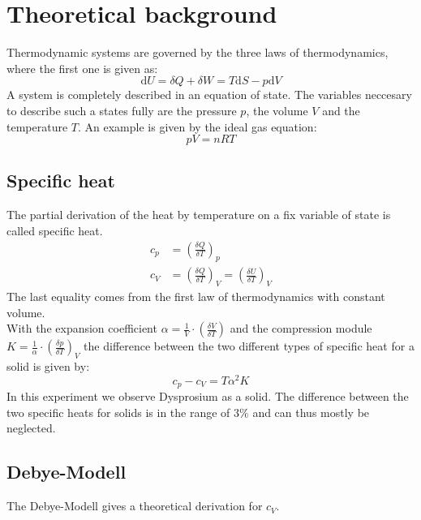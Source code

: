 \documentclass{include/thesisclass3}
\newcommand{\dd}{\text{d}}
\newcommand{\del}{\delta}
\begin{document}
	\FrontMatter
	
	\tableofcontents                  
	\newpage
	\MainMatter

\chapter{Theoretical background}
Thermodynamic systems are governed by the three laws of thermodynamics, where the first one is given as:
\begin{equation}
\dd U = \del Q + \del W = T\dd S - p \dd V
\end{equation} 
A system is completely described in an equation of state. The variables neccesary to describe such a states fully are the pressure $p$, the volume $V$ and the temperature $T$. An example is given by the ideal gas equation:
\begin{equation}
pV=nRT
\end{equation}
\section{Specific heat}
The partial derivation of the heat by temperature on a fix variable of state is called specific heat.
\begin{align}
c_p &=\left(\frac{\del Q}{\del T}\right)_p\\
c_V &=\left(\frac{\del Q}{\del T}\right)_V = \left(\frac{\del U}{\del T}\right)_V\label{cv}
\end{align}
The last equality comes from the first law of thermodynamics with constant volume.\\
With the expansion coefficient $\alpha = \frac{1}{V} \cdot \left(\frac{\del V}{\del T}\right)$ 
and the compression module $K=\frac{1}{\alpha}\cdot \left(\frac{\del p}{\del T}\right)_V$ 
the difference between the two different types of specific heat for a solid is given by: 
\begin{equation}
c_p-c_V=T\alpha ^2 K
\end{equation}
In this experiment we observe Dysprosium as a solid. The difference between the two specific heats for solids is in the range of $3\%$ and can thus mostly be neglected.
\section{Debye-Modell}
The Debye-Modell gives a theoretical derivation for $c_V$.
\end{document}
